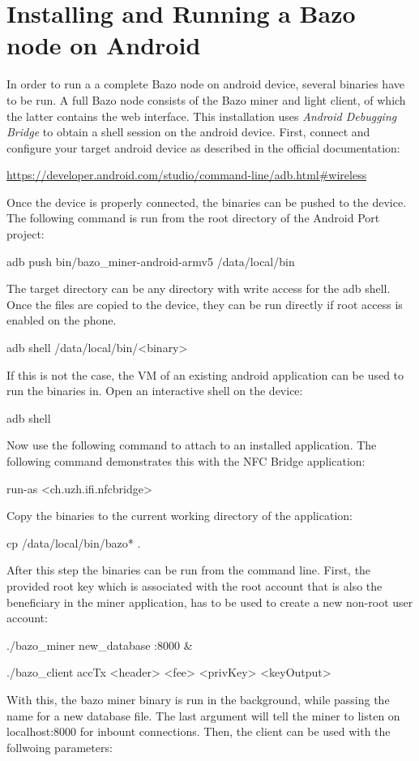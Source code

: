 \section{Installing and Running a Bazo node on Android}\label{bazoandroid}
In order to run a a complete Bazo node on android device, several binaries have to be run. A full Bazo node consists of the Bazo miner and light client, of which the latter contains the web interface.
This installation uses \textit{Android Debugging Bridge} to obtain a shell session on the android device. First, connect and configure your target android device as described in the official documentation:
\begin{framed}\url{https://developer.android.com/studio/command-line/adb.html#wireless}
\end{framed}
Once the device is properly connected, the binaries can be pushed to the device. The following command is run from the root directory of the Android Port project:
\begin{framed}adb push bin/bazo\_miner-android-armv5 /data/local/bin\end{framed}
The target directory can be any directory with write access for the adb shell. Once the files are copied to the device, they can be run directly if root access is enabled on the phone.
\begin{framed}adb shell /data/local/bin/<binary>\end{framed}
If this is not the case, the VM of an existing android application can be used to run the binaries in. Open an interactive shell on the device:
\begin{framed}adb shell\end{framed}
Now use the following command to attach to an installed application. The following command demonstrates this with the NFC Bridge application:
\begin{framed}run-as <ch.uzh.ifi.nfcbridge>\end{framed}
Copy the binaries to the current working directory of the application:
\begin{framed}cp /data/local/bin/bazo* .\end{framed}
After this step the binaries can be run from the command line. 
First, the provided root key which is associated with the root account that is also the beneficiary in the miner application, has to be used to create a new non-root user account:
\begin{framed}./bazo\_miner new\_database :8000 \&

./bazo\_client accTx <header> <fee> <privKey> <keyOutput>
\end{framed}
With this, the bazo miner binary is run in the background, while passing the name for a new database file. The last argument will tell the miner to listen on localhost:8000 for inbount connections. Then, the client can be used with the follwoing parameters:


